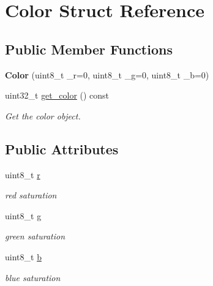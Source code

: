 \hypertarget{struct_color}{}\section{Color Struct Reference}
\label{struct_color}
\subsection*{Public Member Functions}
\begin{DoxyCompactItemize}
\item 
\mbox{\label{struct_color_a9ef3d81cd43e8e24ce01f547f8083a81}} 
{\bfseries Color} (uint8\+\_\+t \+\_\+r=0, uint8\+\_\+t \+\_\+g=0, uint8\+\_\+t \+\_\+b=0)
\item 
uint32\+\_\+t \hyperlink{struct_color_ad89142d0be21d2bf7ca2c2f343dfb21e}{get\+\_\+color} () const
\begin{DoxyCompactList}\small\item\em Get the color object. \end{DoxyCompactList}\end{DoxyCompactItemize}
\subsection*{Public Attributes}
\begin{DoxyCompactItemize}
\item 
\mbox{\label{struct_color_aecbc1a4121c21990512e7c10544d6ece}} 
uint8\+\_\+t \hyperlink{struct_color_aecbc1a4121c21990512e7c10544d6ece}{r}
\begin{DoxyCompactList}\small\item\em red saturation \end{DoxyCompactList}\item 
\mbox{\label{struct_color_a23331f00b02491a901873b5085461d99}} 
uint8\+\_\+t \hyperlink{struct_color_a23331f00b02491a901873b5085461d99}{g}
\begin{DoxyCompactList}\small\item\em green saturation \end{DoxyCompactList}\item 
\mbox{\label{struct_color_a78ede410fb277ade36fbb157f0235d6f}} 
uint8\+\_\+t \hyperlink{struct_color_a78ede410fb277ade36fbb157f0235d6f}{b}
\begin{DoxyCompactList}\small\item\em blue saturation \end{DoxyCompactList}\end{DoxyCompactItemize}


